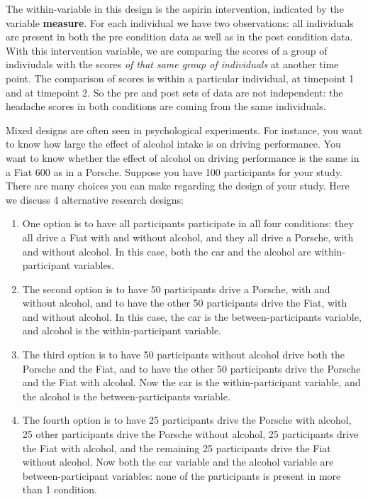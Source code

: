\documentclass[]{book}\usepackage[]{graphicx}\usepackage[]{color}
\begin{document}
The within-variable in this design is the aspirin intervention, indicated by the variable \textbf{measure}. For each individual we have two observations: all individuals are present in both the pre condition data as well as in the post condition data. With this intervention variable, we are comparing the scores of a group of indiviudals with the scores \textit{of that same group of individuals} at another time point. The comparison of scores is within a particular individual, at timepoint 1 and at timepoint 2. So the pre and post sets of data are not independent: the headache scores in both conditions are coming from the same individuals. 

Mixed designs are often seen in psychological experiments. For instance, you want to know how large the effect of alcohol intake is on driving performance. You want to know whether the effect of alcohol on driving performance is the same in a Fiat 600 as in a Porsche. Suppose you have 100 participants for your study. There are many choices you can make regarding the design of your study. Here we discuss 4 alternative research designs:

\begin{enumerate}


\item One option is to have all participants participate in all four conditions: they all drive a Fiat with and without alcohol, and they all drive a Porsche, with and without alcohol. In this case, both the car and the alcohol are within-participant variables.

\item The second option is to have 50 participants drive a Porsche, with and without alcohol, and to have the other 50 participants drive the Fiat, with and without alcohol. In this case, the car is the between-participants variable, and alcohol is the within-participant variable. 

\item The third option is to have 50 participants without alcohol drive both the Porsche and the Fiat, and to have the other 50 participants drive the Porsche and the Fiat with alcohol. Now the car is the within-participant variable, and the alcohol is the between-participants variable.

\item The fourth option is to have 25 participants drive the Porsche with alcohol, 25 other participants drive the Porsche without alcohol, 25 participants drive the Fiat with alcohol, and the remaining 25 participants drive the Fiat without alcohol. Now both the car variable and the alcohol variable are between-participant variables: none of the participants is present in more than 1 condition.

\end{enumerate}
\end{document}
